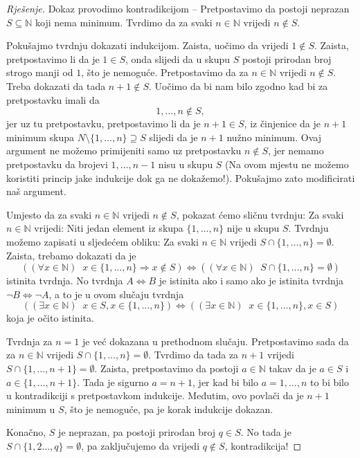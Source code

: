 \begin{proof}[Rješenje]
Dokaz provodimo kontradikcijom -- Pretpostavimo da postoji neprazan $S\subseteq \mathbb{N}$ koji nema minimum. Tvrdimo da za svaki $n\in \mathbb{N}$ vrijedi $n\notin S$. 

Pokušajmo tvrdnju dokazati indukcijom. Zaista, uočimo da vrijedi $1\notin S$. Zaista, pretpostavimo li da je $1\in S$, onda slijedi da u skupu $S$ postoji prirodan broj strogo manji od $1$, što je nemoguće. Pretpostavimo da za $n\in \mathbb{N}$ vrijedi $n\notin S$. Treba dokazati da tada $n+1\notin S$. Uočimo da bi nam bilo zgodno kad bi za pretpostavku imali da $$1, \dots, n\notin S,$$ jer uz tu pretpostavku, pretpostavimo li da je $n+1\in S$, iz činjenice da je $n+1$ minimum skupa $N\setminus \{1, \dots, n\}\supseteq S$ slijedi da je $n+1$ nužno minimum. Ovaj argument ne možemo primijeniti samo uz pretpostavku $n\notin S$, jer nemamo pretpostavku da brojevi $1, \dots, n-1$ nisu u skupu $S$ (Na ovom mjestu ne možemo koristiti princip jake indukcije dok ga ne dokažemo!). Pokušajmo zato modificirati naš argument. 

Umjesto da za svaki $n\in \mathbb{N}$ vrijedi $n\notin S$, pokazat ćemo sličnu tvrdnju: Za svaki $n\in \mathbb{N}$ vrijedi: Niti jedan element iz skupa $\{1, \dots, n\}$ nije u skupu $S$. Tvrdnju možemo zapisati u sljedećem obliku: Za svaki $n\in \mathbb{N}$ vrijedi $S\cap \{1, \dots, n\}=\emptyset$. Zaista, trebamo dokazati da je 
$$\left((\forall x\in \mathbb{N})\;\; x\in \{1, \dots, n\}\Rightarrow x\notin S\right)\Leftrightarrow \left((\forall x\in \mathbb{N})\; \; S\cap \{1, \dots, n\}=\emptyset\right)$$
istinita tvrdnja. No tvrdnja $A\Leftrightarrow B$ je istinita ako i samo ako je istinita tvrdnja $\neg B\Leftrightarrow \neg A$, a to je u ovom slučaju tvrdnja
$$\left((\exists x\in \mathbb{N})\; \; x\in S, x\in \{1, \dots, n\}\right)\Leftrightarrow\left((\exists x\in \mathbb{N})\;\; x\in \{1, \dots, n\}, x\in S\right)$$
koja je očito istinita.

Tvrdnja za $n=1$ je već dokazana u prethodnom slučaju. Pretpostavimo sada da za $n\in \mathbb{N}$ vrijedi $S\cap \{1, \dots, n\}=\emptyset$. Tvrdimo da tada za $n+1$ vrijedi $S\cap \{1, \dots, n+1\}=\emptyset$. Zaista, pretpostavimo da postoji $a\in \mathbb{N}$ takav da je $a\in S$ i $a\in \{1, \dots, n+1\}$. Tada je sigurno $a=n+1$, jer kad bi bilo $a=1, \dots, n$ to bi bilo u kontradikciji s pretpostavkom indukcije. Međutim, ovo povlači da je $n+1$ minimum u $S$, što je nemoguće, pa je korak indukcije dokazan.

Konačno, $S$ je neprazan, pa postoji prirodan broj $q\in S$. No tada je $S\cap \{1, 2\dots, q\}=\emptyset$, pa zaključujemo da vrijedi $q\notin S$, kontradikcija!
\end{proof}
